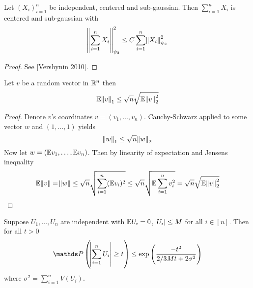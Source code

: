 
\begin{lem}
  Let $(X_i)_{i=1}^n$ be independent, centered and sub-gaussian. Then
  $\sum_{i=1}^n X_i$ is centered and sub-gaussian with
  \begin{equation*} %
    \norm{\sum_{i=1}^n X_i}^2_{\psi_2} \leq C \sum_{i=1}^n \norm{X_i}_{\psi_2}^2
  \end{equation*}
  \label{lem:vershynin5_9}
\end{lem}
\begin{proof}
  See [Vershynin 2010]. %
\end{proof}

\begin{prop}
  \label{lem:norm12ineq}
  Let $v$ be a random vector in $\mathbb{R}^n$ then
  \[ \mathbb{E} \norm{v}_1 \leq \sqrt{n} \sqrt{ \mathbb{E} \norm{v}_2^2 } \]
\end{prop}

\begin{proof}
  Denote $v$'s coordinates $v=(v_1, \dots, v_n)$.
  Cauchy-Schwarz applied to some vector $w$ and $(1, \dots, 1)$ yields
  \[ \norm{w}_1 \leq \sqrt{n} \norm{w}_2 \]
  Now let $w = (\mathbb{E} v_1, \dots, \mathbb{E} v_n)$.
  Then by linearity of expectation and Jensens inequality
  \[ \mathbb{E} \norm{v} = \norm{w} \leq \sqrt{n} \sqrt{\sum_{i=1}^n (\mathbb{E} v_i)^2}
  \leq \sqrt{n} \sqrt{\mathbb{E} \sum_{i=1}^n v_i^2} = \sqrt{n} \sqrt{\mathbb{E} \norm{v}_2^2} \]
\end{proof}

\begin{thm}
  Suppose $U_1, \dots, U_n$ are independent with $\mathbb{E} U_i = 0$, $\abs{U_i} \leq M$
  for all $i \in [n]$. Then for all $t>0$
  \[ \Prob\left(\abs{\sum_{i=1}^n U_i} \geq t\right) \leq
  \exp\left( \frac{-t^2}{2/3 M t + 2 \sigma^2} \right) \]
  where $\sigma^2 = \sum_{i=1}^n V(U_i)$.
  \label{thm:Bernstein}
\end{thm}


